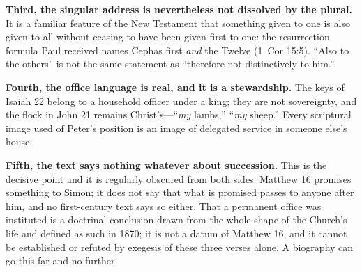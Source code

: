 \textbf{Third, the singular address is nevertheless not dissolved by the
plural.} It is a familiar feature of the New Testament that something given
to one is also given to all without ceasing to have been given first to one:
the resurrection formula Paul received names Cephas first \emph{and} the
Twelve (1~Cor 15:5). ``Also to the others'' is not the same statement as
``therefore not distinctively to him.''

\textbf{Fourth, the office language is real, and it is a stewardship.} The
keys of Isaiah 22 belong to a household officer under a king; they are not
sovereignty, and the flock in John 21 remains Christ's---``\emph{my} lambs,''
``\emph{my} sheep.'' Every scriptural image used of Peter's position is an
image of delegated service in someone else's house.

\textbf{Fifth, the text says nothing whatever about succession.} This is the
decisive point and it is regularly obscured from both sides. Matthew 16
promises something to Simon; it does not say that what is promised passes to
anyone after him, and no first-century text says so either. That a permanent
office was instituted is a doctrinal conclusion drawn from the whole shape of
the Church's life and defined as such in 1870; it is not a datum of
Matthew 16, and it cannot be established or refuted by exegesis of these
three verses alone. A biography can go this far and no further.

